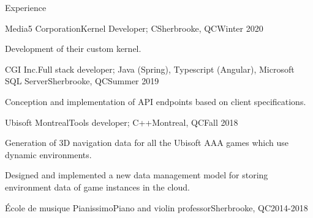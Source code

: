 \documentclass{article}
\newlength{\tabin}
\newlength{\secsep}
\newcommand{\lineunder}{\vspace*{-8pt} \\ \hspace*{-6pt} \hrulefill \\ \vspace*{-15pt}}
\newenvironment{tabbedsection}[1]{
  \begin{list}{}{
      \setlength{\itemsep}{0pt}
      \setlength{\labelsep}{0pt}
      \setlength{\labelwidth}{0pt}
      \setlength{\leftmargin}{\tabin}
      \setlength{\rightmargin}{\tabin}
      \setlength{\listparindent}{0pt}
      \setlength{\parsep}{0pt}
      \setlength{\parskip}{0pt}
      \setlength{\partopsep}{0pt}
      \setlength{\topsep}{#1}
    }
  \item[]
}{\end{list}}
\newenvironment{resume_section}[1]{
  \filbreak
  \vspace{2\secsep}
  \textsc{\large#1}
  \lineunder
  \begin{tabbedsection}{\secsep}
}{\end{tabbedsection}}
\newenvironment{subitems}{
  \renewcommand{\labelitemi}{-}
  \begin{itemize}
      \setlength{\labelsep}{1em}
}{\end{itemize}}
\newenvironment{resume_employer}[4]{
  \vspace{\secsep}
  \textbf{#1} \\ 
  \indent {\small #2} \hfill {\footnotesize#3 (#4)}
  \begin{tabbedsection}{0pt}
  \begin{subitems}
}{\end{subitems}\end{tabbedsection}}
\begin{document}
\begin{resume_section}{Experience}
  \begin{resume_employer}{Media5 Corporation}{Kernel Developer; C}{Sherbrooke, QC}{Winter 2020}
    \item Development of their custom kernel.
  \end{resume_employer}
  \begin{resume_employer}{CGI Inc.}{Full stack developer; Java (Spring), Typescript (Angular), Microsoft SQL Server}{Sherbrooke, QC}{Summer 2019}
    \item Conception and implementation of API endpoints based on client specifications.
  \end{resume_employer}
  
    \begin{resume_employer}{Ubisoft Montreal}{Tools developer; C++}{Montreal, QC}{Fall 2018} 
    \item Generation of 3D navigation data for all the Ubisoft AAA games which use dynamic environments.
    \item Designed and implemented a new data management model for storing environment data of game instances in the cloud.
  \end{resume_employer}
  
  \begin{resume_employer}{École de musique Pianissimo}{Piano and violin professor}{Sherbrooke, QC}{2014-2018}
  \end{resume_employer}
\end{resume_section}
\end{document}
